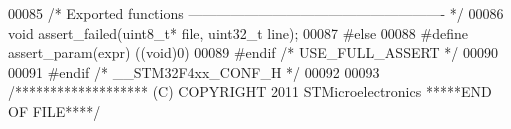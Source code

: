\begin{DoxyCode}
00085 \textcolor{comment}{/* Exported functions ------------------------------------------------------- */}
00086   \textcolor{keywordtype}{void} assert\_failed(uint8\_t* file, uint32\_t line);
00087 \textcolor{preprocessor}{#}\textcolor{preprocessor}{else}
00088   \textcolor{preprocessor}{#}\textcolor{preprocessor}{define} \textcolor{preprocessor}{assert\_param}\textcolor{preprocessor}{(}\textcolor{preprocessor}{expr}\textcolor{preprocessor}{)} \textcolor{preprocessor}{(}\textcolor{preprocessor}{(}\textcolor{keywordtype}{void}\textcolor{preprocessor}{)}0\textcolor{preprocessor}{)}
00089 \textcolor{preprocessor}{#}\textcolor{preprocessor}{endif} \textcolor{comment}{/* USE\_FULL\_ASSERT */}
00090 
00091 \textcolor{preprocessor}{#}\textcolor{preprocessor}{endif} \textcolor{comment}{/* \_\_STM32F4xx\_CONF\_H */}
00092 
00093 \textcolor{comment}{/******************* (C) COPYRIGHT 2011 STMicroelectronics *****END OF FILE****/}
\end{DoxyCode}

